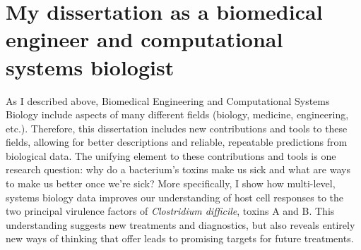 \section[My dissertation as systems biologist]{My dissertation as a biomedical engineer 
              and computational systems biologist}

As I described above, Biomedical Engineering and Computational Systems
Biology include aspects of many different fields (biology, medicine, engineering, etc.).
Therefore, this dissertation includes new contributions and tools to these fields, 
allowing for better descriptions and reliable, repeatable predictions from biological data.
The unifying element to these contributions and tools is one research question:
why do a bacterium's toxins make us sick and what are ways
to make us better once we're sick? More specifically,
I show how multi-level, systems biology data improves our understanding of host cell responses 
to the two principal virulence factors of \textit{Clostridium difficile}, toxins A and B. 
This understanding suggests new treatments and diagnostics, but also 
reveals entirely new ways of thinking that offer leads to promising targets
for future treatments. 
















